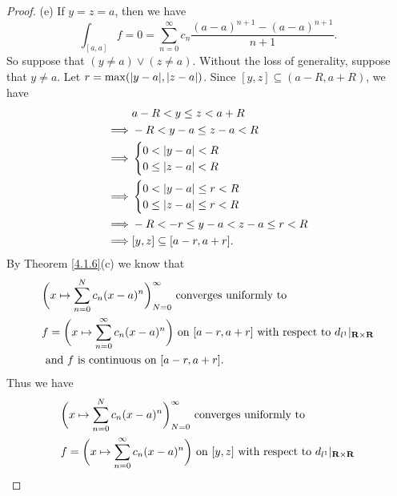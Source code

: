 \begin{proof}{(e)}
    If \(y = z = a\), then we have
    \[
        \int_{[a, a]} f = 0 = \sum_{n = 0}^\infty c_n \frac{(a - a)^{n + 1} - (a - a)^{n + 1}}{n + 1}.
    \]
    So suppose that \((y \neq a) \lor (z \neq a)\).
    Without the loss of generality, suppose that \(y \neq a\).
    Let \(r = \max(\abs{y - a}, \abs{z - a})\).
    Since \([y, z] \subseteq (a - R, a + R)\), we have
    \begin{align*}
                 & a - R < y \leq z < a + R              \\
        \implies & -R < y - a \leq z - a < R             \\
        \implies & \begin{cases}
                       0 < \left\lvert y - a\right\rvert < R \\
                       0 \leq \left\lvert z - a\right\rvert < R
                   \end{cases}                 \\
        \implies & \begin{cases}
                       0 < \left\lvert y - a\right\rvert \leq r < R \\
                       0 \leq \left\lvert z - a\right\rvert \leq r < R
                   \end{cases}          \\
        \implies & -R < -r \leq y - a < z - a \leq r < R \\
        \implies & [y, z] \subseteq [a - r, a + r].
    \end{align*}
    By Theorem \ref{4.1.6}(c) we know that
    \begin{align*}
         & \bigg(x \mapsto \sum_{n = 0}^N c_n (x - a)^n\bigg)_{N = 0}^\infty \text{ converges uniformly to }                                       \\
         & f = \bigg(x \mapsto \sum_{n = 0}^\infty c_n (x - a)^n\bigg) \text{ on } [a - r, a + r] \text{ with respect to } d_{l^1}|_{\mathbf{R} \times \mathbf{R}} \\
         & \text{ and } f \text{ is continuous on } [a - r, a + r].
    \end{align*}
    Thus we have
    \begin{align*}
         & \bigg(x \mapsto \sum_{n = 0}^N c_n (x - a)^n\bigg)_{N = 0}^\infty \text{ converges uniformly to }                               \\
         & f = \bigg(x \mapsto \sum_{n = 0}^\infty c_n (x - a)^n\bigg) \text{ on } [y, z] \text{ with respect to } d_{l^1}|_{\R \times \R} \\

\end{align*}
\end{proof}
